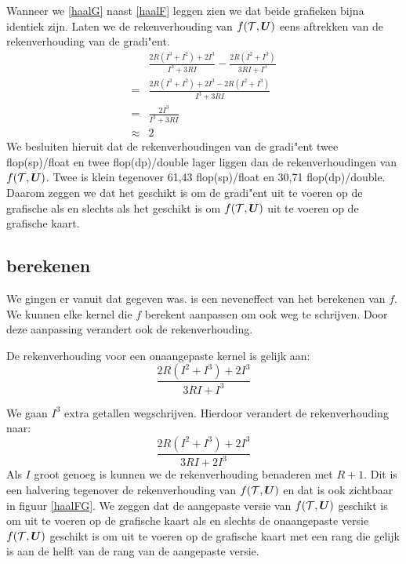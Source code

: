 Wanneer we \ref{haalG} naast \ref{haalF} leggen zien we dat beide grafieken bijna identiek zijn. Laten we de rekenverhouding van $f(\mathcal{T}, \boldsymbol{U})$ eens aftrekken van de rekenverhouding van de gradi"ent.
\begin{align*}
		&	\frac{2R (I^3 + I^2) + 2I^3}{I^3 + 3RI} - \frac{2R (I^2 + I^3)}{3RI + I^3}\\
		=&	\frac{2R(I^3 + I^2) + 2I^3 - 2R (I^2 + I^3)}{I^3 + 3RI}\\
		=&	\frac{2I^3}{I^3 + 3RI}\\
\approx  &	2
\end{align*}
We besluiten hieruit dat de rekenverhoudingen van de gradi"ent twee flop(sp)/float en twee flop(dp)/double lager liggen dan de rekenverhoudingen van $f(\mathcal{T}, \boldsymbol{U})$. Twee  is klein tegenover 61,43 flop(sp)/float en 30,71 flop(dp)/double. Daarom zeggen we dat het geschikt is om de gradi"ent uit te voeren op de grafische als en slechts als het geschikt is om $f(\mathcal{T}, \boldsymbol{U})$ uit te voeren op de grafische kaart.

\subsection{\FF{} berekenen}
We gingen er vanuit dat \FF{} gegeven was. \FF{} is een neveneffect van het berekenen van $f$. We kunnen elke kernel die $f$ berekent aanpassen om ook \FF{} weg te schrijven. Door deze aanpassing verandert ook de rekenverhouding.

De rekenverhouding voor een onaangepaste kernel is gelijk aan:
\[
    \frac{2R (I^2 + I^3) + 2I^3}{3RI + I^3}
\]

We gaan $I^3$ extra getallen wegschrijven. Hierdoor verandert de rekenverhouding naar:
\[
    \frac{2R (I^2 + I^3) + 2I^3}{3RI + 2I^3}
\]
Als $I$ groot genoeg is kunnen we de rekenverhouding benaderen met $R + 1$.  Dit is een halvering tegenover de rekenverhouding van $f(\mathcal{T}, \boldsymbol{U})$ en dat is ook zichtbaar in figuur \ref{haalFG}. We zeggen dat de aangepaste versie van $f(\mathcal{T}, \boldsymbol{U})$ geschikt is om uit te voeren op de grafische kaart als en slechts de onaangepaste versie $f(\mathcal{T}, \boldsymbol{U})$ geschikt is om uit te voeren op de grafische kaart met een rang die gelijk is aan de helft van de rang van de aangepaste versie.

